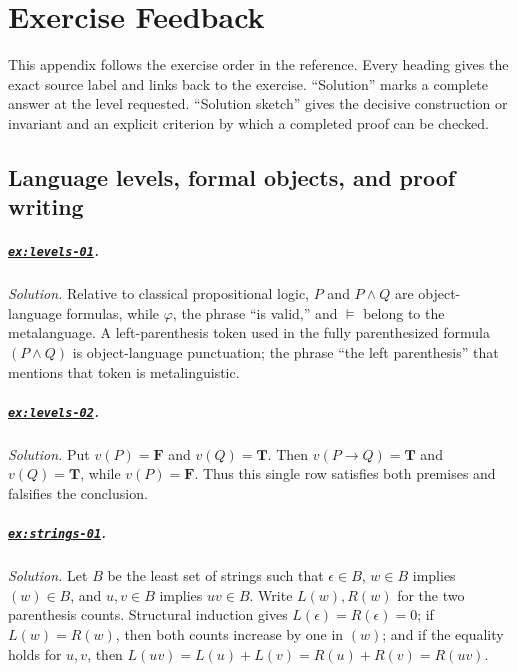 \documentclass[11pt,oneside,openany]{book}
\theoremstyle{definition}
\theoremstyle{plain}
\theoremstyle{remark}
\newcommand{\entails}{\models}
\newcommand{\True}{\mathbf{T}}
\newcommand{\False}{\mathbf{F}}
\begin{document}
\chapter{Exercise Feedback}
\label{ch:exercise-feedback}
\label{app:exercise-feedback}

This appendix follows the exercise order in the reference.  Every heading gives
the exact source label and links back to the exercise.  ``Solution'' marks a
complete answer at the level requested.  ``Solution sketch'' gives the decisive
construction or invariant and an explicit criterion by which a completed proof
can be checked.

\section{Language levels, formal objects, and proof writing}

\paragraph{\hyperref[ex:levels-01]{\texttt{ex:levels-01}}.}
\textit{Solution.}  Relative to classical propositional logic, \(P\) and
\(P\land Q\) are object-language formulas, while \(\varphi\), the phrase ``is
valid,'' and \(\entails\) belong to the metalanguage.  A left-parenthesis token
used in the fully parenthesized formula \((P\land Q)\) is object-language
punctuation; the phrase ``the left parenthesis'' that mentions that token is
metalinguistic.

\paragraph{\hyperref[ex:levels-02]{\texttt{ex:levels-02}}.}
\textit{Solution.}  Put \(v(P)=\False\) and \(v(Q)=\True\).  Then
\(v(P\to Q)=\True\) and \(v(Q)=\True\), while \(v(P)=\False\).  Thus this
single row satisfies both premises and falsifies the conclusion.

\paragraph{\hyperref[ex:strings-01]{\texttt{ex:strings-01}}.}
\textit{Solution.}  Let \(B\) be the least set of strings such that
\(\epsilon\in B\), \(w\in B\) implies \((w)\in B\), and \(u,v\in B\) implies
\(uv\in B\).  Write \(L(w),R(w)\) for the two parenthesis counts.  Structural
induction gives \(L(\epsilon)=R(\epsilon)=0\); if \(L(w)=R(w)\), then both
counts increase by one in \((w)\); and if the equality holds for \(u,v\), then
\(L(uv)=L(u)+L(v)=R(u)+R(v)=R(uv)\).
\end{document}
